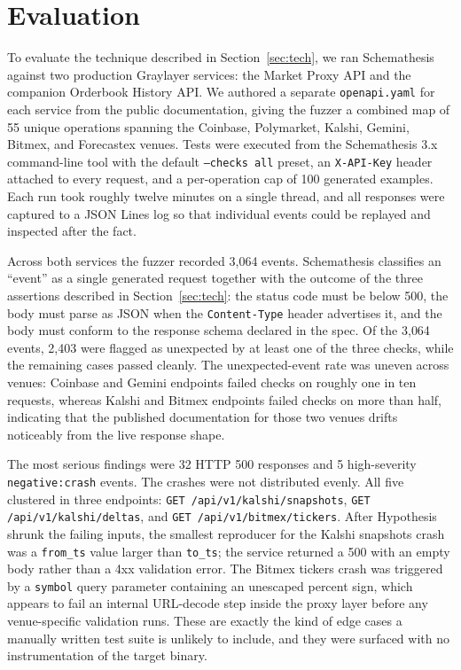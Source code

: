 \documentclass[12pt]{article}
\begin{document}
\section{Evaluation}
\author{Rohan Sah}
\label{sec:eval}

To evaluate the technique described in Section~\ref{sec:tech}, we ran
Schemathesis against two production Graylayer services: the Market Proxy
API and the companion Orderbook History API. We authored a separate
\texttt{openapi.yaml} for each service from the public documentation,
giving the fuzzer a combined map of 55 unique operations spanning the
Coinbase, Polymarket, Kalshi, Gemini, Bitmex, and Forecastex venues.
Tests were executed from the Schemathesis 3.x command-line tool with
the default \texttt{--checks all} preset, an \texttt{X-API-Key} header
attached to every request, and a per-operation cap of 100 generated
examples. Each run took roughly twelve minutes on a single thread, and
all responses were captured to a JSON Lines log so that individual
events could be replayed and inspected after the fact.

Across both services the fuzzer recorded 3{,}064 events. Schemathesis
classifies an ``event'' as a single generated request together with the
outcome of the three assertions described in Section~\ref{sec:tech}:
the status code must be below 500, the body must parse as JSON when
the \texttt{Content-Type} header advertises it, and the body must
conform to the response schema declared in the spec. Of the 3{,}064
events, 2{,}403 were flagged as unexpected by at least one of the
three checks, while the remaining cases passed cleanly. The
unexpected-event rate was uneven across venues: Coinbase and Gemini
endpoints failed checks on roughly one in ten requests, whereas Kalshi
and Bitmex endpoints failed checks on more than half, indicating that
the published documentation for those two venues drifts noticeably
from the live response shape.

The most serious findings were 32 HTTP 500 responses and 5
high-severity \texttt{negative:crash} events. The crashes were not
distributed evenly. All five clustered in three endpoints:
\texttt{GET /api/v1/kalshi/snapshots},
\texttt{GET /api/v1/kalshi/deltas}, and
\texttt{GET /api/v1/bitmex/tickers}. After Hypothesis shrunk the
failing inputs, the smallest reproducer for the Kalshi snapshots
crash was a \texttt{from\_ts} value larger than \texttt{to\_ts}; the
service returned a 500 with an empty body rather than a 4xx
validation error. The Bitmex tickers crash was triggered by a
\texttt{symbol} query parameter containing an unescaped percent sign,
which appears to fail an internal URL-decode step inside the proxy
layer before any venue-specific validation runs. These are exactly
the kind of edge cases a manually written test suite is unlikely to
include, and they were surfaced with no instrumentation of the
target binary.
\end{document}
